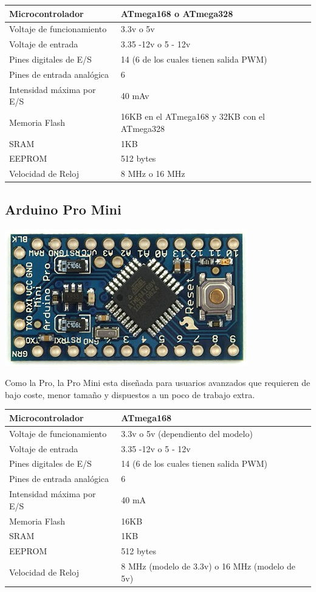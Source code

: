 \documentclass[12pt,a4paper]{report}
\begin{document}
\begin{tabular}{||l | l ||}
\hline
\hline
Microcontrolador & ATmega168 o ATmega328\\
\hline
Voltaje de funcionamiento & 3.3v o 5v\\
\hline
Voltaje de entrada & 3.35 -12v o 5 - 12v\\
\hline
Pines digitales de E/S & 14 (6 de los cuales tienen salida PWM)\\
\hline
Pines de entrada analógica & 6\\
\hline
Intensidad máxima por E/S & 40 mAv\\
\hline
Memoria Flash & 16KB en el ATmega168 y 32KB con el ATmega328 \\
\hline
SRAM & 1KB\\
\hline
EEPROM & 512 bytes\\
\hline
Velocidad de Reloj & 8 MHz o 16 MHz\\
\hline
\hline
\end{tabular}

\subsection{Arduino Pro Mini}

\includegraphics[scale=0.6]{ArduinoProMini.jpg}

Como la Pro, la Pro Mini esta diseñada para usuarios avanzados que requieren de
bajo coste, menor tamaño y dispuestos a un poco de trabajo extra. 

\begin{tabular}{||l | l ||}
\hline
\hline
Microcontrolador & ATmega168\\
\hline
Voltaje de funcionamiento & 3.3v o 5v (dependiento del modelo)\\
\hline
Voltaje de entrada & 3.35 -12v o 5 - 12v\\
\hline
Pines digitales de E/S & 14 (6 de los cuales tienen salida PWM)\\
\hline
Pines de entrada analógica & 6\\
\hline
Intensidad máxima por E/S & 40 mA\\
\hline
Memoria Flash & 16KB\\
\hline
SRAM & 1KB\\
\hline
EEPROM & 512 bytes\\
\hline
Velocidad de Reloj & 8 MHz (modelo de 3.3v) o 16 MHz (modelo de 5v)\\
\hline
\hline
\end{tabular}
\end{document}
